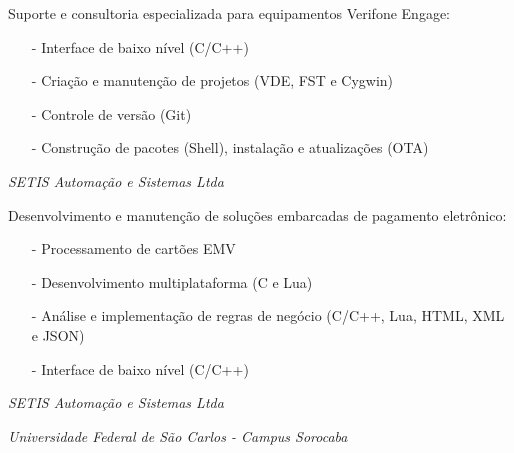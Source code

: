 \documentclass[11pt,a4paper,sans]{moderncv}
\begin{document}

\hspace{1.25cm} \begin{minipage}[htb]{\linewidth - 1.25cm}
    Suporte e consultoria especializada para equipamentos Verifone
    Engage:
    \begin{itemize}
        \item[-] Interface de baixo nível (C/C++)
        \item[-] Criação e manutenção de projetos (VDE, FST e Cygwin)
        \item[-] Controle de versão (Git)
        \item[-] Construção de pacotes (Shell), instalação e atualizações (OTA)
    \end{itemize}
\end{minipage}

\vspace{\baselineskip}

\hspace{1.25cm} \textit{SETIS Automação e Sistemas Ltda}


\hspace{1.25cm} \begin{minipage}[htb]{\linewidth - 1.25cm}
    Desenvolvimento e manutenção de soluções embarcadas de pagamento
    eletrônico:
    \begin{itemize}
        \item[-] Processamento de cartões EMV
        \item[-] Desenvolvimento multiplataforma (C e Lua)
        \item[-] Análise e implementação de regras de negócio (C/C++, Lua,
                 HTML, XML e JSON)
        \item[-] Interface de baixo nível (C/C++)
    \end{itemize}
\end{minipage}

\vspace{\baselineskip}

\hspace{1.25cm} \textit{SETIS Automação e Sistemas Ltda}


\vspace{\baselineskip}

\hspace{1.25cm} \textit{Universidade Federal de São Carlos - Campus Sorocaba}
\end{document}
